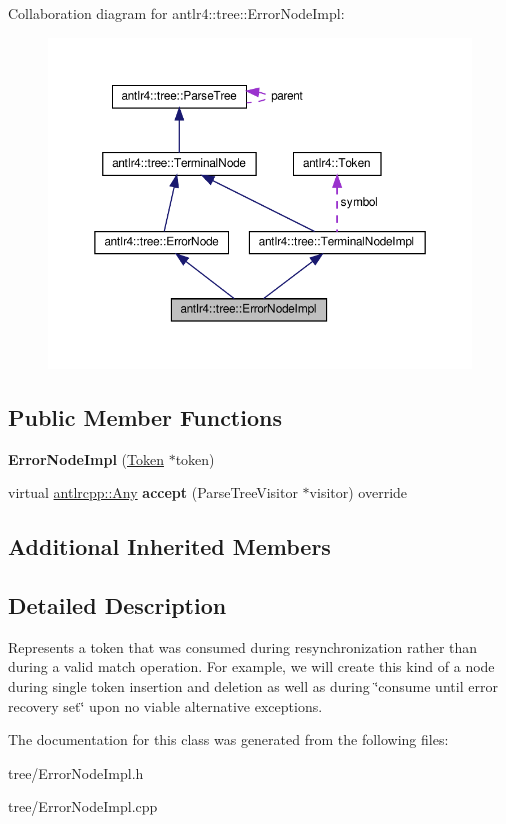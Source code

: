 Collaboration diagram for antlr4\+:\+:tree\+:\+:Error\+Node\+Impl\+:
\nopagebreak
\begin{figure}[H]
\begin{center}
\leavevmode
\includegraphics[width=350pt]{classantlr4_1_1tree_1_1ErrorNodeImpl__coll__graph}
\end{center}
\end{figure}
\subsection*{Public Member Functions}
\begin{DoxyCompactItemize}
\item 
\mbox{\label{classantlr4_1_1tree_1_1ErrorNodeImpl_a62a01a09215038907392f3c861ed0d2e}} 
{\bfseries Error\+Node\+Impl} (\hyperlink{classantlr4_1_1Token}{Token} $\ast$token)
\item 
\mbox{\label{classantlr4_1_1tree_1_1ErrorNodeImpl_a746a33c109fcce3bbe3e40aab2cdb06b}} 
virtual \hyperlink{structantlrcpp_1_1Any}{antlrcpp\+::\+Any} {\bfseries accept} (Parse\+Tree\+Visitor $\ast$visitor) override
\end{DoxyCompactItemize}
\subsection*{Additional Inherited Members}


\subsection{Detailed Description}
Represents a token that was consumed during resynchronization rather than during a valid match operation. For example, we will create this kind of a node during single token insertion and deletion as well as during \char`\"{}consume until error recovery set\char`\"{} upon no viable alternative exceptions. 



The documentation for this class was generated from the following files\+:\begin{DoxyCompactItemize}
\item 
tree/Error\+Node\+Impl.\+h\item 
tree/Error\+Node\+Impl.\+cpp\end{DoxyCompactItemize}
